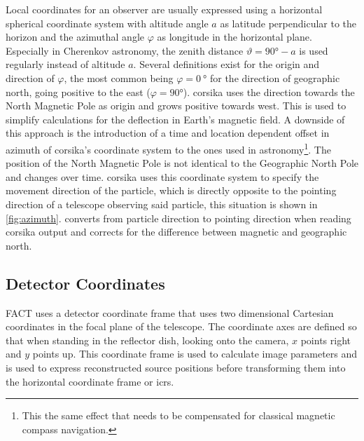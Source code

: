 \noindent Local coordinates for an observer are usually expressed using a horizontal spherical coordinate 
system with altitude angle $a$ as latitude perpendicular to the horizon and the azimuthal angle $φ$ as longitude in the horizontal plane.
Especially in Cherenkov astronomy, the zenith distance $ϑ = \ang{90} - a$ is used
regularly instead of altitude $a$.
Several definitions exist for the origin and direction of $φ$,
the most common being $φ = \SI{0}{\degree}$ for the direction of geographic north, going positive to the east ($φ = \ang{90}$).
\gls{corsika} uses the direction towards the North Magnetic Pole as origin
and grows positive towards west.
This is used to simplify calculations for the deflection in Earth's magnetic field.
A downside of this approach is the introduction of a time and location dependent offset in azimuth of \gls{corsika}'s coordinate system to the ones used in astronomy\footnote{This the same effect that needs to be compensated for classical magnetic compass navigation.}.
The position of the North Magnetic Pole is not identical
to the Geographic North Pole and changes over time.
\gls{corsika} uses this coordinate system to specify the movement direction of the particle, which is directly
opposite to the pointing direction of a telescope observing said particle,
this situation is shown in \autoref{fig:azimuth}.
\ceres{} converts from particle direction to pointing direction when reading \gls{corsika}
output and corrects for the difference between magnetic and geographic north.

\subsection{Detector Coordinates}
FACT uses a detector coordinate frame that uses two dimensional Cartesian 
coordinates in the focal plane of the telescope. 
The coordinate axes are defined so that when standing in the reflector dish,
looking onto the camera, $x$ points right and $y$ points up.
This coordinate frame is used to calculate image parameters and  is used to express
reconstructed source positions before transforming them into the horizontal coordinate frame or \gls{icrs}.

